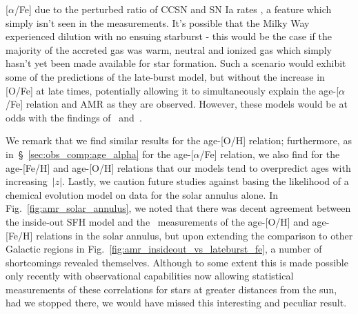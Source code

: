 \documentclass[fleqn, usenatbib]{mnras}
\begin{document}
[$\alpha$/Fe] due to the perturbed ratio of CCSN and SN Ia rates 
\citep{Johnson2020}, a feature which simply isn't seen in the 
\citet{Feuillet2019} measurements. It's possible that the Milky Way experienced 
dilution with no ensuing starburst - this would be the case if the majority of 
the accreted gas was warm, neutral and ionized gas which simply hasn't yet been 
made available for star formation. Such a scenario would exhibit some of the 
predictions of the late-burst model, but without the increase in [O/Fe] at late 
times, potentially allowing it to simultaneously explain the age-[$\alpha$/Fe] 
relation and AMR as they are observed. However, these models would be at odds 
with the findings of~\citet{Mor2019} and~\citet{Isern2019}. 
\par 
We remark that we find similar results for the age-[O/H] relation; furthermore, 
as in~\S~\ref{sec:obs_comp:age_alpha} for the age-[$\alpha$/Fe] relation, we 
also find for the age-[Fe/H] and age-[O/H] relations that our models tend to 
overpredict ages with increasing~$\left|z\right|$. Lastly, we caution future 
studies against basing the likelihood of a chemical evolution model on data 
for the solar annulus alone. In Fig.~\ref{fig:amr_solar_annulus}, we 
noted that there was decent agreement between the inside-out SFH model and 
the~\citet{Feuillet2019} measurements of the age-[O/H] and age-[Fe/H] 
relations in the solar annulus, but upon extending the comparison to other 
Galactic regions in Fig.~\ref{fig:amr_insideout_vs_lateburst_fe}, a number of 
shortcomings revealed themselves. Although to some extent this is made possible 
only recently with observational capabilities now allowing statistical 
measurements of these correlations for stars at greater distances from the sun, 
had we stopped there, we would have missed this interesting and peculiar 
result. 
\end{document}

